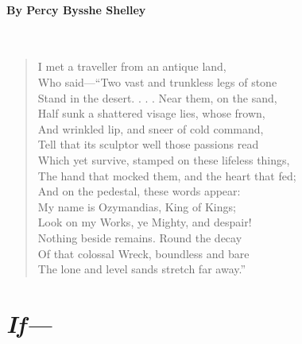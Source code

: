 \paragraph{By Percy Bysshe Shelley}~
\begin{verse}
	I met a traveller from an antique land,\\
	Who said—“Two vast and trunkless legs of stone\\
	Stand in the desert. . . . Near them, on the sand,\\
	Half sunk a shattered visage lies, whose frown,\\
	And wrinkled lip, and sneer of cold command,\\
	Tell that its sculptor well those passions read\\
	Which yet survive, stamped on these lifeless things,\\
	The hand that mocked them, and the heart that fed;\\
	And on the pedestal, these words appear:\\
	My name is Ozymandias, King of Kings;\\
	Look on my Works, ye Mighty, and despair!\\
	Nothing beside remains. Round the decay\\
	Of that colossal Wreck, boundless and bare\\
	The lone and level sands stretch far away.”
\end{verse}

\newpage
\section*{\emph{If---}}
